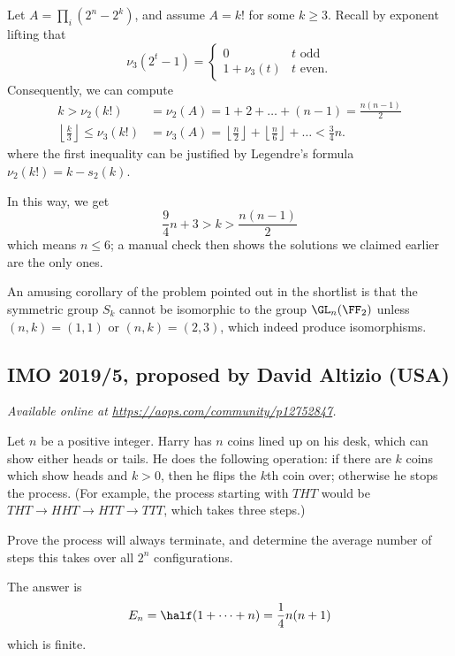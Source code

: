 \documentclass[11pt]{scrartcl}
\begin{document}
Let $A = \prod_i (2^n-2^k)$, and assume $A = k!$ for some $k \ge 3$.
Recall by exponent lifting that
\[ \nu_3(2^t-1) = \begin{cases}
    0 & t \text{ odd} \\
    1 + \nu_3(t) & t \text{ even}.
  \end{cases} \]
Consequently, we can compute
\begin{align*}
  k > \nu_2(k!) &= \nu_2(A) = 1 + 2 + \dots + (n-1) = \frac{n(n-1)}{2} \\
  \left\lfloor \frac k3 \right\rfloor
    \le \nu_3(k!) &= \nu_3(A) = \left\lfloor \frac n2 \right\rfloor
    + \left\lfloor \frac n6 \right\rfloor + \dots < \frac 34n.
\end{align*}
where the first inequality can be justified
by Legendre's formula $\nu_2(k!) = k - s_2(k)$.

In this way, we get
\[ \frac 94 n + 3 > k > \frac{n(n-1)}{2} \]
which means $n \le 6$; a manual check then shows the
solutions we claimed earlier are the only ones.

\begin{remark*}
  An amusing corollary of the problem pointed out in the shortlist
  is that the symmetric group $S_k$ cannot be isomorphic to the group $\GL_n(\FF_2)$
  unless $(n,k) = (1,1)$ or $(n,k) = (2,3)$, which indeed produce isomorphisms.
\end{remark*}
\pagebreak

\subsection{IMO 2019/5, proposed by David Altizio (USA)}
\textsl{Available online at \url{https://aops.com/community/p12752847}.}
\begin{mdframed}[style=mdpurplebox,frametitle={Problem statement}]
Let $n$ be a positive integer.
Harry has $n$ coins lined up on his desk, which can show either heads or tails.
He does the following operation: if there are $k$ coins which show heads and $k > 0$,
then he flips the $k$th coin over; otherwise he stops the process.
(For example, the process starting with $THT$ would be
$THT \to HHT \to HTT \to TTT$, which takes three steps.)

Prove the process will always terminate, and determine the average number of steps
this takes over all $2^n$ configurations.
\end{mdframed}
The answer is \[ E_n = \half (1 + \dots + n) = \frac14 n(n+1) \]
which is finite.
\end{document}
